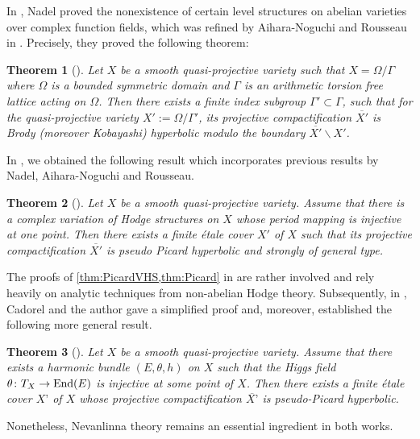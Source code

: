 \documentclass[english]{amsproc}
\theoremstyle{plain}
\newtheorem{thm}{Theorem}[section]
\theoremstyle{definition}
\theoremstyle{remark}
\theoremstyle{plain}
\numberwithin{equation}{thm} %
\def\End{{\rm \small  End}}
\begin{document}
In \cite{Nad89}, Nadel proved the nonexistence of certain level structures on abelian varieties over complex function fields, which was refined by Aihara-Noguchi and  Rousseau in \cite{AN91,Rou16}. Precisely, they proved the following theorem:
\begin{thm}[\cite{Nad89,Rou16}]
	Let $X$ be a smooth quasi-projective variety such that $X=\Omega/\Gamma$ where $\Omega$ is a bounded symmetric domain and $\Gamma$ is an arithmetic torsion free lattice acting on $\Omega$. Then there exists a finite index subgroup $\Gamma'\subset \Gamma$, such that  for the quasi-projective variety $X':=\Omega/\Gamma'$, its projective compactification $\overline{X'}$ is Brody (moreover Kobayashi) hyperbolic modulo the boundary $\overline{X'}\backslash X'$. 
\end{thm}
In \cite{Denarxiv},   we obtained the following result which incorporates previous results by Nadel, Aihara-Noguchi and Rousseau. 
\begin{thm}[{\cite[Theorem B]{Denarxiv}}]\label{thm:Picard}
	Let $X$ be a smooth quasi-projective variety. Assume that there is a complex variation of  Hodge structures on $X$ whose period mapping is injective at one  point.  Then there exists a finite \'etale cover $X'$ of $X$ such that  its projective compactification $\overline{X'}$ is pseudo Picard hyperbolic and strongly of general type.  
\end{thm}
The proofs of \cref{thm:PicardVHS,thm:Picard} in \cite{Denarxiv} are rather involved and rely heavily on analytic techniques from non-abelian Hodge theory. Subsequently, in \cite{CD21}, Cadorel and the author gave a simplified proof and, moreover, established the following more general result. 
\begin{thm}[\cite{CD21}]
	Let $X$ be a smooth quasi-projective variety. Assume that there exists a harmonic bundle $(E,\theta,h)$ on $X$ such that the Higgs field $\theta\colon T_X \to \End(E)$ is injective at some point of $X$. Then there exists a finite \'etale cover $X’$ of $X$ whose projective compactification $\overline{X’}$ is pseudo-Picard hyperbolic.
\end{thm} 
Nonetheless, Nevanlinna theory remains an essential ingredient in both works.
\end{document}
